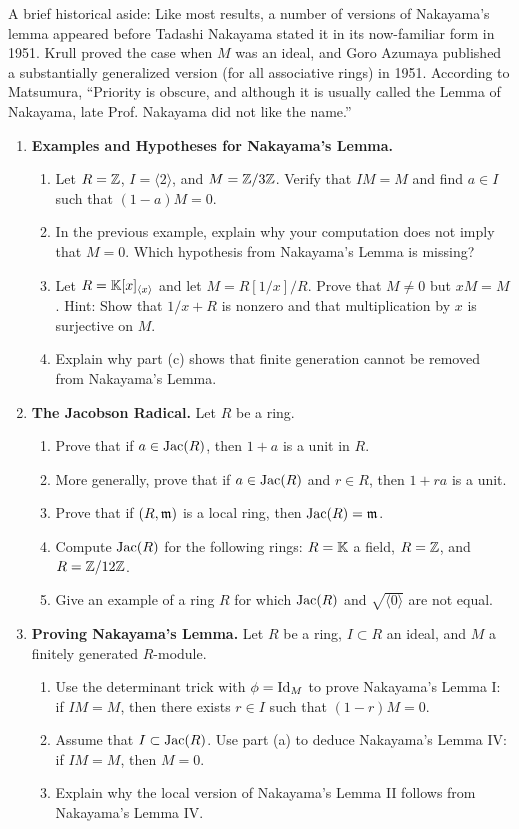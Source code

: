 \documentclass[12pt,reqno]{amsart}
\begin{document}
A brief historical aside: Like most results, a number of versions of Nakayama's lemma appeared before Tadashi Nakayama stated it in its now-familiar form in  1951. Krull proved the case when $M$ was an ideal, and Goro Azumaya published a substantially generalized version (for all associative rings) in 1951. According to Matsumura, ``Priority is obscure, and although it is usually called the Lemma of Nakayama, late Prof. Nakayama did not like the name.''

\hrulefill

\begin{enumerate}[leftmargin=*, resume=problems]

\item \textbf{Examples and Hypotheses for Nakayama's Lemma.}
\begin{enumerate}
    \item Let $R=\mathbb{Z}$,  $I=\langle 2\rangle$, and  $M=\mathbb{Z}/3\mathbb{Z}$. Verify that $IM=M$ and find $a\in I$ such that $(1-a)M=0$.
    \item In the previous example, explain why your computation does not imply that $M=0$. Which hypothesis from Nakayama's Lemma is missing?
    \item Let $R=\mathbb{K}[x]_{\langle x\rangle}$ and let $M=R[1/x]/R$. Prove that $M\neq 0$ but $xM=M$. Hint: Show that $1/x+R$ is nonzero and that multiplication by $x$ is surjective on $M$.
    \item Explain why part (c) shows that finite generation cannot be removed from Nakayama's Lemma.
\end{enumerate}

\item \textbf{The Jacobson Radical.} Let $R$ be a ring.
\begin{enumerate}
    \item Prove that if $a\in \operatorname{Jac}(R)$, then $1+a$ is a unit in $R$.
    \item More generally, prove that if $a\in \operatorname{Jac}(R)$ and $r\in R$, then $1+ra$ is a unit.
    \item Prove that if $(R,\mathfrak{m})$ is a local ring, then $\operatorname{Jac}(R)=\mathfrak{m}$.
    \item Compute $\operatorname{Jac}(R)$ for the following rings: $R=\mathbb{K}$ a field, $R=\mathbb{Z}$, and $R=\mathbb{Z}/12\mathbb{Z}$.
        \item Give an example of a ring $R$ for which $\operatorname{Jac}(R)$ and $\sqrt{\langle 0\rangle}$ are not equal.
\end{enumerate}

\item \textbf{Proving Nakayama's Lemma.} Let $R$ be a ring, $I\subset R$ an ideal, and $M$ a finitely generated $R$-module. 
\begin{enumerate}
    \item Use the determinant trick with $\phi=\operatorname{Id}_{M}$ to prove Nakayama's Lemma I: if $IM=M$, then there exists $r\in I$ such that $(1-r)M=0$.
    \item Assume that $I \subset \operatorname{Jac}(R)$. Use part (a) to deduce Nakayama's Lemma IV: if $IM=M$, then $M=0$.
    \item Explain why the local version of Nakayama's Lemma II follows from Nakayama's Lemma IV.
\end{enumerate}


\end{enumerate}
\end{document}
